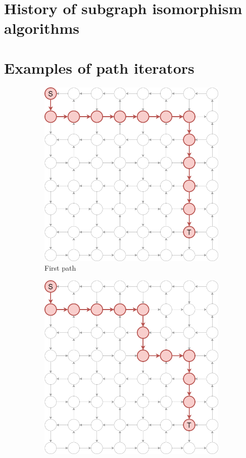 \documentclass[12pt, oneside]{report}
\theoremstyle{plain}
\theoremstyle{definition}
\theoremstyle{indented}
\begin{document}
\begin{appendices}
\section{History of subgraph isomorphism algorithms}
\label{app:algorithmHistory}




\section{Examples of path iterators}
\begin{figure}[ht]
\begin{subfigure}{.5\textwidth}
  \centering
\includegraphics[width=0.8\linewidth]{images/pathiterators/examples-kpath-1.png}
  \caption{First path}
\end{subfigure}
\begin{subfigure}{.5\textwidth}
  \centering
\includegraphics[width=0.8\linewidth]{images/pathiterators/examples-kpath-2.png}

\end{subfigure}
\end{figure}
\end{appendices}
\end{document}
